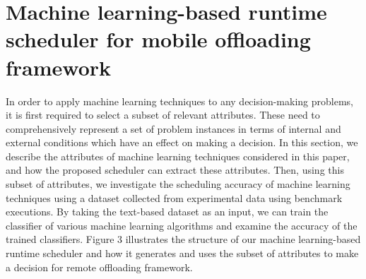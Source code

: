 \documentclass[10pt, conference, compsocconf]{IEEEtran}
\begin{document}
\section{Machine learning-based runtime scheduler for mobile offloading
framework}
In order to apply machine learning techniques to any decision-making
problems, it is first required to select a subset of relevant
attributes.
%
These need to comprehensively represent a set of problem instances 
in terms of internal and external conditions which have an effect on making a
decision.
%
In this section, we describe the attributes of machine learning
techniques considered in this paper, and how the proposed scheduler can
extract these attributes.
%
Then, using this subset of attributes, we investigate the scheduling
accuracy of machine learning techniques using a dataset collected from
experimental data using benchmark executions.
%
%
%
By taking the text-based dataset as an input, we can train
the classifier of various machine learning algorithms and examine the
accuracy of the trained classifiers.
%
Figure 3 illustrates the structure of our machine learning-based runtime
scheduler and how it generates and uses the subset of attributes to make
a decision for remote offloading framework.
%
%
\end{document}
